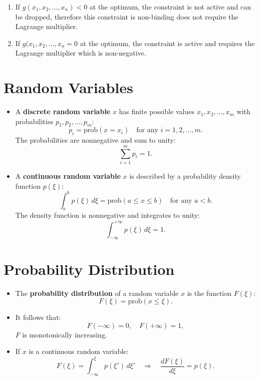 \begin{itemize}
\begin{itemize}[label=\textbullet]
\begin{itemize}
            \begin{enumerate}
                \item If $g(x_1, x_2, \ldots, x_n) < 0$ at the optimum, the constraint is not active and can be dropped, therefore this constraint is non-binding does not require the Lagrange multiplier.
                \item If $g(x_1, x_2, \ldots, x_n = 0$ at the optimum, the constraint is active and requires the Lagrange multiplier which is non-negative.
            \end{enumerate}
        \end{itemize}
    \end{itemize}
\end{itemize}

\section{Random Variables}

\begin{itemize}[label=\textbullet]
    \item A \textbf{discrete random variable} \( x \) has finite possible values \( x_1, x_2, \ldots, x_m \) with probabilities \( p_1, p_2, \ldots, p_m \):
    \[
    p_i = \text{prob}(x = x_i) \quad \text{for any } i = 1, 2, \ldots, m.
    \]
    The probabilities are nonnegative and sum to unity:
    \[
    \sum_{i=1}^m p_i = 1.
    \]
    \item A \textbf{continuous random variable} \( x \) is described by a probability density function \( p(\xi) \):
    \[
    \int_a^b p(\xi) \, d\xi = \text{prob}(a \leq x \leq b) \quad \text{for any } a < b.
    \]
    The density function is nonnegative and integrates to unity:
    \[
    \int_{-\infty}^{+\infty} p(\xi) \, d\xi = 1.
    \]
\end{itemize}

\section{Probability Distribution}

\begin{itemize}[label=\textbullet]
    \item The \textbf{probability distribution} of a random variable \( x \) is the function \( F(\xi) \):
    \[
    F(\xi) = \text{prob}(x \leq \xi).
    \]
    \item It follows that:
    \[
    F(-\infty) = 0, \quad F(+\infty) = 1,
    \]
    \( F \) is monotonically increasing.
    \item If \( x \) is a continuous random variable:
    \[
    F(\xi) = \int_{-\infty}^{\xi} p(\xi') \, d\xi' \quad \Rightarrow \quad \frac{dF(\xi)}{d\xi} = p(\xi).
    \]
\end{itemize}

